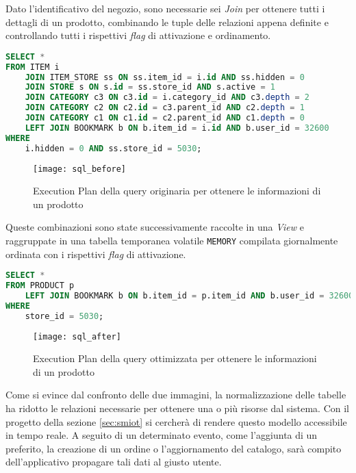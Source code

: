 Dato l'identificativo del negozio, sono necessarie sei \textit{Join} per ottenere tutti i dettagli di un prodotto, combinando le tuple delle relazioni appena definite e controllando tutti i rispettivi \textit{flag} di attivazione e ordinamento.

\begin{lstlisting}[language=sql, label={lst:supermercato24DatabaseBefore}, captionpos=b, caption={Query originaria per ottenere le informazioni di un prodotto}, basicstyle=\scriptsize\ttfamily]
SELECT *
FROM ITEM i
    JOIN ITEM_STORE ss ON ss.item_id = i.id AND ss.hidden = 0
    JOIN STORE s ON s.id = ss.store_id AND s.active = 1
    JOIN CATEGORY c3 ON c3.id = i.category_id AND c3.depth = 2
    JOIN CATEGORY c2 ON c2.id = c3.parent_id AND c2.depth = 1
    JOIN CATEGORY c1 ON c1.id = c2.parent_id AND c1.depth = 0
    LEFT JOIN BOOKMARK b ON b.item_id = i.id AND b.user_id = 32600
WHERE
    i.hidden = 0 AND ss.store_id = 5030;
\end{lstlisting}

\begin{figure}[H]
  \centering
  \texttt{[image: sql\_before]}
  \caption{Execution Plan della query originaria per ottenere le informazioni di un prodotto}
  \label{fig:sql_before}
\end{figure}

Queste combinazioni sono state successivamente raccolte in una \textit{View} e raggruppate in una tabella temporanea volatile \verb+MEMORY+ compilata giornalmente ordinata con i rispettivi \textit{flag} di attivazione.

\begin{lstlisting}[language=sql, label={lst:supermercato24DatabaseAfter}, captionpos=b, caption={Query ottimizzata per ottenere le informazioni di un prodotto}, basicstyle=\scriptsize\ttfamily]
SELECT *
FROM PRODUCT p
    LEFT JOIN BOOKMARK b ON b.item_id = p.item_id AND b.user_id = 32600
WHERE
    store_id = 5030;
\end{lstlisting}

\begin{figure}[H]
  \centering
  \texttt{[image: sql\_after]}
  \caption{Execution Plan della query ottimizzata per ottenere le informazioni di un prodotto}
  \label{fig:sql_after}
\end{figure}

Come si evince dal confronto delle due immagini, la normalizzazione delle tabelle ha ridotto le relazioni necessarie per ottenere una o più risorse dal sistema.
Con il progetto della sezione \ref{sec:smiot} si cercherà di rendere questo modello accessibile in tempo reale.
A seguito di un determinato evento, come l'aggiunta di un preferito, la creazione di un ordine o l'aggiornamento del catalogo, sarà compito dell'applicativo propagare tali dati al giusto utente.

